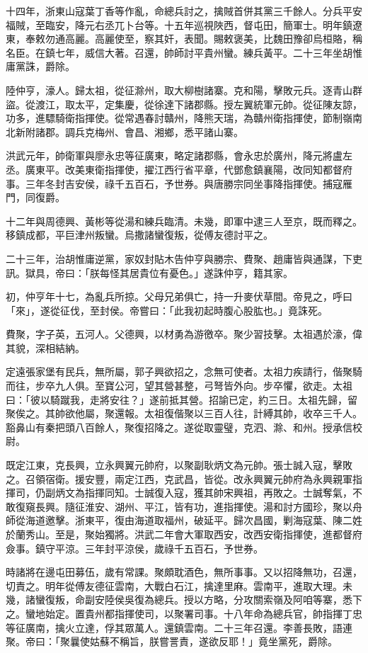 \begin{pinyinscope}
十四年，浙東山寇葉丁香等作亂，命總兵討之，擒賊首併其黨三千餘人。分兵平安福賊，至臨安，降元右丞兀卜台等。十五年巡視陜西，督屯田，簡軍士。明年鎮遼東，奉敕勿通高麗。高麗使至，察其奸，表聞。賜敕褒美，比魏田豫卻烏桓賂，稱名臣。在鎮七年，威信大著。召還，帥師討平貴州蠻。練兵黃平。二十三年坐胡惟庸黨誅，爵除。

陸仲亨，濠人。歸太祖，從征滁州，取大柳樹諸寨。克和陽，擊敗元兵。逐青山群盜。從渡江，取太平，定集慶，從徐達下諸郡縣。授左翼統軍元帥。從征陳友諒，功多，進驃騎衛指揮使。從常遇春討贛州，降熊天瑞，為贛州衛指揮使，節制嶺南北新附諸郡。調兵克梅州、會昌、湘鄉，悉平諸山寨。

洪武元年，帥衛軍與廖永忠等征廣東，略定諸郡縣，會永忠於廣州，降元將盧左丞。廣東平。改美東衛指揮使，擢江西行省平章，代鄧愈鎮襄陽，改同知都督府事。三年冬封吉安侯，祿千五百石，予世券。與唐勝宗同坐事降指揮使。捕寇雁門，同復爵。

十二年與周德興、黃彬等從湯和練兵臨清。未幾，即軍中逮三人至京，既而釋之。移鎮成都，平巨津州叛蠻。烏撒諸蠻復叛，從傅友德討平之。

二十三年，治胡惟庸逆黨，家奴封貼木告仲亨與勝宗、費聚、趙庸皆與通謀，下吏訊。獄具，帝曰：「朕每怪其居貴位有憂色。」遂誅仲亨，籍其家。

初，仲亨年十七，為亂兵所掠。父母兄弟俱亡，持一升麥伏草間。帝見之，呼曰「來」，遂從征伐，至封侯。帝嘗曰：「此我初起時腹心股肱也。」竟誅死。

費聚，字子英，五河人。父德興，以材勇為游徼卒。聚少習技擊。太祖遇於濠，偉其貌，深相結納。

定遠張家堡有民兵，無所屬，郭子興欲招之，念無可使者。太祖力疾請行，偕聚騎而往，步卒九人俱。至寶公河，望其營甚整，弓弩皆外向。步卒懼，欲走。太祖曰：「彼以騎蹴我，走將安往？」遂前抵其營。招諭已定，約三日。太祖先歸，留聚俟之。其帥欲他屬，聚還報。太祖復偕聚以三百人往，計縛其帥，收卒三千人。豁鼻山有秦把頭八百餘人，聚復招降之。遂從取靈璧，克泗、滁、和州。授承信校尉。

既定江東，克長興，立永興翼元帥府，以聚副耿炳文為元帥。張士誠入寇，擊敗之。召領宿衛。援安豐，兩定江西，克武昌，皆從。改永興翼元帥府為永興親軍指揮司，仍副炳文為指揮同知。士誠復入寇，獲其帥宋興祖，再敗之。士誠奪氣，不敢復窺長興。隨征淮安、湖州、平江，皆有功，進指揮使。湯和討方國珍，聚以舟師從海道邀擊。浙東平，復由海道取福州，破延平。歸次昌國，剿海寇葉、陳二姓於蘭秀山。至是，聚始獨將。洪武二年會大軍取西安，改西安衛指揮使，進都督府僉事。鎮守平涼。三年封平涼侯，歲祿千五百石，予世券。

時諸將在邊屯田募伍，歲有常課。聚頗耽酒色，無所事事。又以招降無功，召還，切責之。明年從傅友德征雲南，大戰白石江，擒達里麻。雲南平，進取大理。未幾，諸蠻復叛，命副安陸侯吳復為總兵。授以方略，分攻關索嶺及阿咱等寨，悉下之。蠻地始定。置貴州都指揮使司，以聚署司事。十八年命為總兵官，帥指揮丁忠等征廣南，擒火立達，俘其眾萬人。還鎮雲南。二十三年召還。李善長敗，語連聚。帝曰：「聚曩使姑蘇不稱旨，朕嘗詈責，遂欲反耶！」竟坐黨死，爵除。


\end{pinyinscope}
